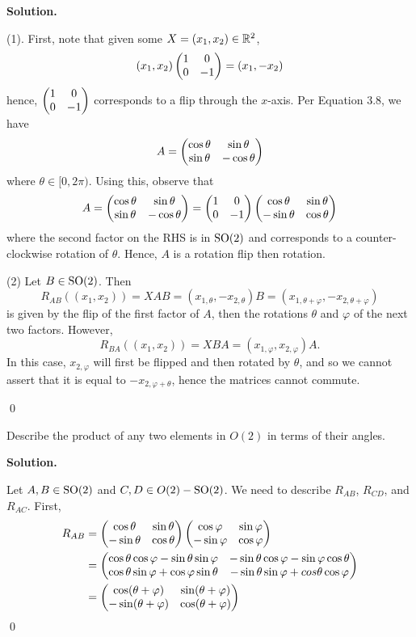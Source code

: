 \documentclass[12pt]{book}
\theoremstyle{definition}
\newenvironment{solution}
{%
  \par\noindent\textbf{Solution.}\quad
}
{%
  \qed\par
}
\begin{document}
\begin{solution}
  (1). First, note that given some $X = (x_1, x_2) \in \mathbb{R}^2$,
  \[
    (x_1, x_2)\begin{pmatrix} 1 & 0 \\ 0 & -1 \end{pmatrix} = (x_1, -x_2)
  \]
  hence, $\begin{pmatrix} 1 & 0 \\ 0 & -1 \end{pmatrix}$ corresponds to a flip through the $x$-axis.
  Per Equation 3.8, we have
  \[
  A = \begin{pmatrix} \cos\theta & \sin\theta \\ \sin\theta & -\cos\theta \end{pmatrix}
  \]
  where $\theta \in [0, 2\pi)$.
  Using this, observe that
  \[
    A = \begin{pmatrix} \cos\theta & \sin\theta \\ \sin\theta & -\cos\theta \end{pmatrix} = \begin{pmatrix} 1 & 0 \\ 0 & -1 \end{pmatrix} \begin{pmatrix} \cos \theta & \sin \theta \\ -\sin\theta & \cos\theta \end{pmatrix}
  \]
  where the second factor on the RHS is in $\mathrm{SO}(2)$ and corresponds to a counter-clockwise rotation of $\theta$.
  Hence, $A$ is a rotation flip then rotation.

  (2) Let $B \in \mathrm{SO}(2)$. Then 
  \[
  R_{AB}((x_1, x_2)) = XAB = (x_{1, \theta}, -x_{2, \theta})B = (x_{1, \theta + \varphi}, -x_{2, \theta + \varphi})
  \]
  is given by the flip of the first factor of $A$, then the rotations $\theta$ and $\varphi$ of the next two factors.
  However,
  \[
  R_{BA}((x_1, x_2)) = XBA = (x_{1, \varphi}, x_{2, \varphi})A.
  \]
  In this case, $x_{2, \varphi}$ will first be flipped and then rotated by $\theta$, and so we cannot assert that it is equal to $-x_{2, \varphi + \theta}$, hence the matrices cannot commute.

\end{solution}

\begin{taggedexercise}[WIP]
  Describe the product of any two elements in $O(2)$ in terms of their angles.
\end{taggedexercise}

\begin{solution}
  Let $A, B \in \mathrm{SO}(2)$ and $C, D \in O(2) - \mathrm{SO}(2)$.
  We need to describe $R_{AB}$, $R_{CD}$, and $R_{AC}$.
  First, 
  \[
  \begin{aligned}
    R_{AB} &= \begin{pmatrix} \cos \theta & \sin \theta \\ -\sin\theta & \cos\theta \end{pmatrix} \begin{pmatrix} \cos \varphi & \sin \varphi \\ -\sin\varphi & \cos\varphi \end{pmatrix} \\
           &= \begin{pmatrix} \cos\theta\cos\varphi - \sin\theta\sin\varphi & -\sin\theta\cos\varphi - \sin\varphi\cos\theta \\ \cos\theta\sin\varphi + \cos\varphi\sin\theta & -\sin\theta\sin\varphi + cos\theta\cos\varphi \end{pmatrix} \\
           &= \begin{pmatrix} \cos(\theta + \varphi) & \sin(\theta + \varphi) \\ -\sin(\theta + \varphi) & \cos(\theta + \varphi) \end{pmatrix}
  \end{aligned}
  \]
\end{solution}
\end{document}
